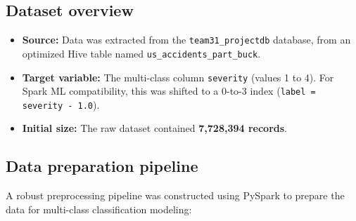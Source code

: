 \documentclass[11pt,a4paper]{article}
\begin{document}
\subsection*{Dataset overview}
\begin{itemize}
    \item \textbf{Source:} Data was extracted from the \texttt{team31\_projectdb} database, from an optimized Hive table named \texttt{us\_accidents\_part\_buck}.
    \item \textbf{Target variable:} The multi-class column \texttt{severity} (values 1 to 4). For Spark ML compatibility, this was shifted to a 0-to-3 index (\texttt{label = severity - 1.0}).
    \item \textbf{Initial size:} The raw dataset contained \textbf{7,728,394 records}.
\end{itemize}

\subsection*{Data preparation pipeline}
A robust preprocessing pipeline was constructed using PySpark to prepare the data for multi-class classification modeling:
\end{document}
